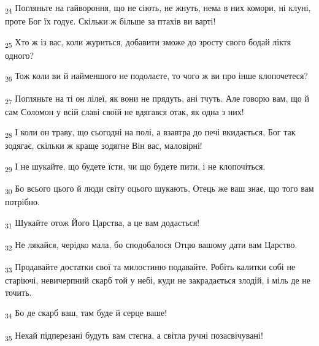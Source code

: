 \begin{tcolorbox}
\textsubscript{24} Погляньте на гайвороння, що не сіють, не жнуть, нема в них комори, ні клуні, проте Бог їх годує. Скільки ж більше за птахів ви варті!
\end{tcolorbox}
\begin{tcolorbox}
\textsubscript{25} Хто ж із вас, коли журиться, добавити зможе до зросту свого бодай ліктя одного?
\end{tcolorbox}
\begin{tcolorbox}
\textsubscript{26} Тож коли ви й найменшого не подолаєте, то чого ж ви про інше клопочетеся?
\end{tcolorbox}
\begin{tcolorbox}
\textsubscript{27} Погляньте на ті он лілеї, як вони не прядуть, ані тчуть. Але говорю вам, що й сам Соломон у всій славі своїй не вдягався отак, як одна з них!
\end{tcolorbox}
\begin{tcolorbox}
\textsubscript{28} І коли он траву, що сьогодні на полі, а взавтра до печі вкидається, Бог так зодягає, скільки ж краще зодягне Він вас, маловірні!
\end{tcolorbox}
\begin{tcolorbox}
\textsubscript{29} І не шукайте, що будете їсти, чи що будете пити, і не клопочіться.
\end{tcolorbox}
\begin{tcolorbox}
\textsubscript{30} Бо всього цього й люди світу оцього шукають, Отець же ваш знає, що того вам потрібно.
\end{tcolorbox}
\begin{tcolorbox}
\textsubscript{31} Шукайте отож Його Царства, а це вам додасться!
\end{tcolorbox}
\begin{tcolorbox}
\textsubscript{32} Не лякайся, черідко мала, бо сподобалося Отцю вашому дати вам Царство.
\end{tcolorbox}
\begin{tcolorbox}
\textsubscript{33} Продавайте достатки свої та милостиню подавайте. Робіть калитки собі не старіючі, невичерпний скарб той у небі, куди не закрадається злодій, і міль де не точить.
\end{tcolorbox}
\begin{tcolorbox}
\textsubscript{34} Бо де скарб ваш, там буде й серце ваше!
\end{tcolorbox}
\begin{tcolorbox}
\textsubscript{35} Нехай підперезані будуть вам стегна, а світла ручні позасвічувані!
\end{tcolorbox}
